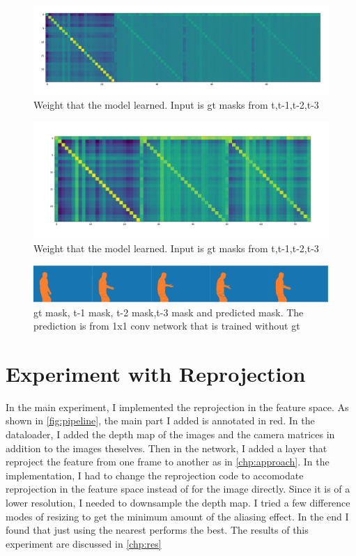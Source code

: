 \begin{figure}
\centering
\includegraphics[scale=0.22]{fig/weights_4.png}
\caption{Weight that the model learned. Input is gt masks from t,t-1,t-2,t-3}
\label{fig:w4}
\end{figure}
\begin{figure}
\centering
\includegraphics[scale=0.22]{fig/weights_3.png}
\caption{Weight that the model learned. Input is gt masks from t,t-1,t-2,t-3}
\label{fig:w3}
\end{figure}

\begin{figure}
\centering
\includegraphics[scale=0.23]{fig/pred.png}
\caption{gt mask, t-1 mask, t-2 mask,t-3 mask and predicted mask. The prediction is from 1x1 conv network that is trained without gt}
\label{fig:plot1}
\end{figure}




\section{Experiment with Reprojection}
In the main experiment, I implemented the reprojection in the feature space. As shown in \ref{fig:pipeline}, the main part I added is annotated in red. In the dataloader, I added the depth map of the images and the camera matrices in addition to the images theselves. Then in the network, I added a layer that reproject the feature from one frame to another as in \ref{chp:approach}. In the implementation, I had to change the reprojection code to accomodate reprojection in the feature space instead of for the image directly. Since it is of a lower resolution, I needed to downsample the depth map. I tried a few difference modes of resizing to get the minimum amount of the aliasing effect. In the end I found that just using the nearest performs the best. The results of this experiment are discussed in \ref{chp:res}

